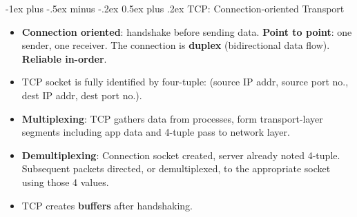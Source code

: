 \documentclass[12pt, landscape]{article}
\makeatletter
\renewcommand{\section}{\@startsection{section}{1}{0mm}%
                                {-1ex plus -.5ex minus -.2ex}%
                                {0.5ex plus .2ex}%
                                {\normalfont\large\bfseries}}
\makeatother
\begin{document}
\begin{multicols*}{3}
\section{TCP: Connection-oriented Transport}
\begin{itemize}
\item \textbf{Connection oriented}: handshake before sending data. \textbf{Point to point}: one sender, one receiver. The connection is \textbf{duplex} (bidirectional data flow). \textbf{Reliable in-order}.
\item TCP socket is fully identified by four-tuple: (source IP addr, source port no., dest IP addr, dest port no.). 
\item \textbf{Multiplexing}: TCP gathers data from processes, form transport-layer segments including app data and 4-tuple pass to network layer. 
\item \textbf{Demultiplexing}: Connection socket created, server already noted 4-tuple. Subsequent packets directed, or demultiplexed, to the appropriate socket using those 4 values.
\item TCP creates \textbf{buffers} after handshaking. 
\end{itemize}


\end{multicols*}
\end{document}
